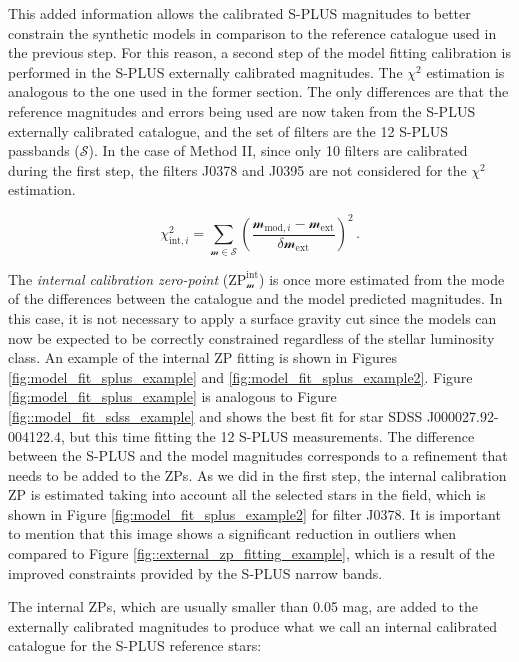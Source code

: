 \documentclass[fleqn,usenatbib]{mnras}
\begin{document}
This added information allows the calibrated S-PLUS magnitudes to better constrain the synthetic models in comparison to the reference catalogue used in the previous step. For this reason, a second step of the model fitting calibration is performed in the S-PLUS externally calibrated magnitudes. The $\chi^2$ estimation is analogous to the one used in the former section. The only differences are that the reference magnitudes and errors being used are now taken from the S-PLUS externally calibrated catalogue, and the set of filters are the 12 S-PLUS passbands ($\mathscr{S}$). In the case of Method II, since only 10 filters are calibrated during the first step, the filters J0378 and J0395 are not considered for the $\chi^2$ estimation.

\begin{equation}
 \chi^2_{\mathrm{int},i} = \sum_{\mathcal{m} \in \mathscr{S}} \left( \frac{ \mathcal{m}_{\mathrm{mod}, i} - \mathcal{m}_{\mathrm{ext}} } {\delta \mathcal{m}_\mathrm{ext} } \right)^2 \,.
\end{equation}

The \textit{internal calibration zero-point} ($\mathrm{ZP}_\mathcal{m}^\mathrm{int}$) is once more estimated from the mode of the differences between the catalogue and the model predicted magnitudes. In this case, it is not necessary to apply a surface gravity cut since the models can now be expected to be correctly constrained regardless of the stellar luminosity class. An example of the internal ZP fitting is shown in Figures \ref{fig:model_fit_splus_example} and \ref{fig:model_fit_splus_example2}. Figure \ref{fig:model_fit_splus_example} is analogous to Figure \ref{fig::model_fit_sdss_example} and shows the best fit for star SDSS J000027.92-004122.4, but this time fitting the 12 S-PLUS measurements. The difference between the S-PLUS and the model magnitudes corresponds to a refinement that needs to be added to the ZPs. As we did in the first step, the internal calibration ZP is estimated taking into account all the selected stars in the field, which is shown in Figure \ref{fig:model_fit_splus_example2} for filter J0378. It is important to mention that this image shows a significant reduction in outliers when compared to Figure \ref{fig::external_zp_fitting_example}, which is a result of the improved constraints provided by the S-PLUS narrow bands.

The internal ZPs, which are usually smaller than 0.05 mag, are added to the externally calibrated magnitudes to produce what we call an internal calibrated catalogue for the S-PLUS reference stars:
\end{document}
